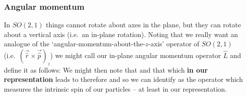 \subsubsection{Angular momentum}
In $SO(2,1)$ things cannot rotate about axes in the plane, but they can rotate about a vertical axis (i.e.~an in-plane rotation). Noting that we really want an analogue of the `angular-momentum-about-the-$z$-axis' operator of $SO(2,1)$ (i.e.~$(\vec{\hat r} \times \vec {\hat p})_z$) we might call our in-plane angular momentum operator $\hat L$ and define it as follows: %
We might then note that
and that
which \textbf{in our representation} leads to
%
therefore
%
and so we can identify  
%
as the operator which measures the intrinsic spin of our particles -- at least in our representation.

